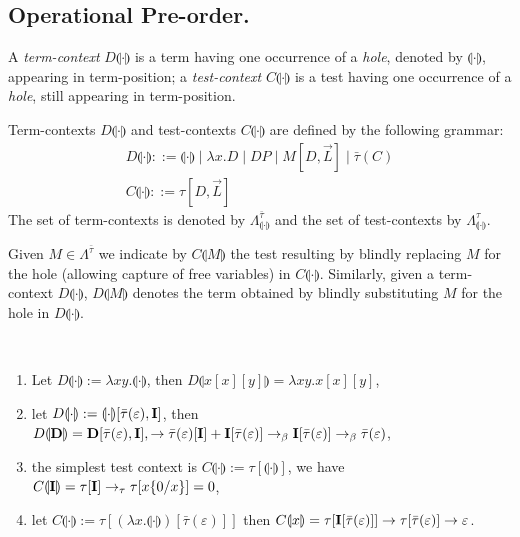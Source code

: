 \documentclass{LMCS}
\newcommand{\lam}{\ensuremath{\lambda}}
\renewcommand{\hole}[1]{\llparenthesis #1\rrparenthesis}
\newcommand{\Set}[1]{\Lambda^{#1}}
\newcommand{\ContSet}{\Set{\gt}_{\hole{\cdot}}}
\newcommand{\subst}[2]{\{ #2 / #1 \}}	\newcommand{\dg}[2]{\mathrm{deg}_{#1}(#2)} \newcommand{\obsle}{\sqsubseteq_{\mathcal{O}}}
\newcommand{\gramm}{\mathrel{::=}}
\newcommand{\ass}{:=}
\newcommand{\seq}[1]{\vec{#1}}
\newcommand{\gt}{\ensuremath{\tau}}
\newcommand{\gto}{\ensuremath{\bar\tau}}
\begin{document}
\subsection{\bf Operational Pre-order.} A \emph{term-context} $D\hole{\cdot}$ is a term having one occurrence 
of a \emph{hole}, denoted by $\hole{\cdot}$, appearing in term-position;
a \emph{test-context} $C\hole{\cdot}$ is a test having one occurrence 
of a \emph{hole}, still appearing in term-position.

\begin{defi} Term-contexts $D\hole{\cdot}$ and test-contexts $C\hole{\cdot}$ are defined by the following grammar:
\begin{gather*}
	D\hole{\cdot}\gramm \hole{\cdot} \mid \lam x.D \mid DP \mid M[D,\seq L] \mid \gto(C)\\
	C\hole{\cdot}\gramm \gt[D,\seq L]
\end{gather*}
The set of term-contexts is denoted by $\Set{\gto}_{\hole{\cdot}}$ 
and the set of test-contexts by $\ContSet$.
\end{defi}

Given $M\in\Set{\gto}$ we indicate by $C\hole{M}$ the test resulting 
by blindly replacing $M$ for the hole (allowing capture of free variables) in $C\hole{\cdot}$.
Similarly, given a term-context $D\hole{\cdot}$, $D\hole{M}$ denotes the term obtained 
by blindly substituting $M$ for the hole in $D\hole{\cdot}$.

\begin{exa}\
\begin{enumerate}[1.] 
\item Let $D\hole{\cdot} \ass \lam xy.\hole{\cdot}$, then $D\hole{x[x][y]} = \lam xy.x[x][y]$,
\item let $D\hole{\cdot} \ass \hole{\cdot}[\gto(\varepsilon),\bold{I}]$, then $D\hole{\bold{D}} = \bold{D}[\gto(\varepsilon),\bold{I}],
		\to \gto(\varepsilon)[\bold{I}] + \bold{I}[\gto(\varepsilon)] \to_\beta  \bold{I}[\gto(\varepsilon)]\to_\beta \gto(\varepsilon)$,
\item the simplest test context is $C\hole{\cdot} \ass \gt[\hole{\cdot}]$, 
we have $C\hole{\bold{I}} = \gt[\bold{I}]\to_{\tau} \gt[x\subst{x}{0}] = 0$,
\item let $C\hole{\cdot} \ass \gt[(\lam x.\hole{\cdot})[\gto(\varepsilon)]]$ then $C\hole{x} = \gt[\bold{I}[\gto(\varepsilon)]]\to \gt[\gto(\varepsilon)]\to \varepsilon$.
\end{enumerate}

\end{exa}
\end{document}
